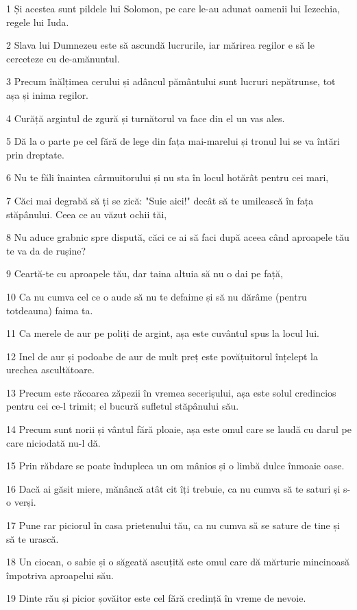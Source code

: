 \par 1 Și acestea sunt pildele lui Solomon, pe care le-au adunat oamenii lui Iezechia, regele lui Iuda.
\par 2 Slava lui Dumnezeu este să ascundă lucrurile, iar mărirea regilor e să le cerceteze cu de-amănuntul.
\par 3 Precum înălțimea cerului și adâncul pământului sunt lucruri nepătrunse, tot așa și inima regilor.
\par 4 Curăță argintul de zgură și turnătorul va face din el un vas ales.
\par 5 Dă la o parte pe cel fără de lege din fața mai-marelui și tronul lui se va întări prin dreptate.
\par 6 Nu te făli înaintea cârmuitorului și nu sta în locul hotărât pentru cei mari,
\par 7 Căci mai degrabă să ți se zică: "Suie aici!" decât să te umilească în fața stăpânului. Ceea ce au văzut ochii tăi,
\par 8 Nu aduce grabnic spre dispută, căci ce ai să faci după aceea când aproapele tău te va da de rușine?
\par 9 Ceartă-te cu aproapele tău, dar taina altuia să nu o dai pe față,
\par 10 Ca nu cumva cel ce o aude să nu te defaime și să nu dărâme (pentru totdeauna) faima ta.
\par 11 Ca merele de aur pe poliți de argint, așa este cuvântul spus la locul lui.
\par 12 Inel de aur și podoabe de aur de mult preț este povățuitorul înțelept la urechea ascultătoare.
\par 13 Precum este răcoarea zăpezii în vremea secerișului, așa este solul credincios pentru cei ce-l trimit; el bucură sufletul stăpânului său.
\par 14 Precum sunt norii și vântul fără ploaie, așa este omul care se laudă cu darul pe care niciodată nu-l dă.
\par 15 Prin răbdare se poate îndupleca un om mânios și o limbă dulce înmoaie oase.
\par 16 Dacă ai găsit miere, mănâncă atât cit îți trebuie, ca nu cumva să te saturi și s-o verși.
\par 17 Pune rar piciorul în casa prietenului tău, ca nu cumva să se sature de tine și să te urască.
\par 18 Un ciocan, o sabie și o săgeată ascuțită este omul care dă mărturie mincinoasă împotriva aproapelui său.
\par 19 Dinte rău și picior șovăitor este cel fără credință în vreme de nevoie.
